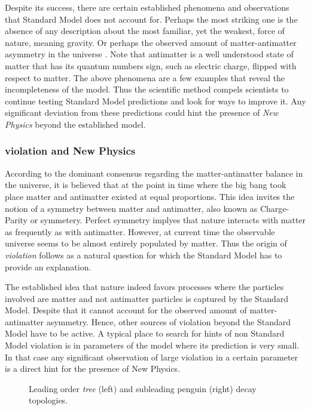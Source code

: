 Despite its success, there are certain established phenomena and observations that Standard
Model does not account for. Perhaps the most striking one is the absence of any description
about the most familiar, yet the weakest, force of nature, meaning gravity. Or perhaps the
observed amount of matter-antimatter asymmetry in the universe \cite{more-cpv-huet,more-cpv-gavela_I,more-cpv-gavela_II}.
Note that antimatter is a well understood state of matter that has its quantum numbers sign,
such as electric charge, flipped with respect to matter. The above phenomena are a few
examples that reveal the incompleteness of the model. Thus the scientific method compels
scientists to continue testing Standard Model predictions and look for ways to improve it.
Any significant deviation from these predictions could hint the presence of {\it New Physics}
beyond the established model.

\subsubsection{\CP violation and New Physics}
According to the dominant consensus regarding the matter-antimatter balance in the
universe, it is believed that at the point in time where the big bang took place
matter and antimatter existed at equal proportions. This idea invites the notion of a symmetry between matter and
antimatter, also known as Charge-Parity or \CP symmetery. Perfect \CP symmetry
implyes that nature interacts with matter as frequently as with antimatter.
However, at current time the observable universe seems to be almost entirely
populated by matter. Thus the origin of {\it \CP  violation} follows
as a natural question for which the Standard Model has to provide an explanation.

The established idea that nature indeed favors processes where the particles involved
are matter and not antimatter particles is captured by the Standard Model.
Despite that it cannot account for the observed amount of matter-antimatter asymmetry.
Hence, other sources of \CP violation beyond the Standard Model have to be active.
A typical place to search for hints of non Standard Model \CP violation is in parameters
of the model where its prediction is very small. In that case any significant observation
of large \CP violation in a certain parameter is a direct hint for the presence of New Physics.


\begin{figure}[t]
  \begin{subfigure}{0.5\textwidth}
    \raggedright
    {\scalebox{1}{\sffamily }}
    \caption{}
    \label{app_jpsiphi_tree}
  \end{subfigure}%
  \hfill
  \begin{subfigure}{0.5\textwidth}
    \raggedleft
    {\scalebox{1}{\sffamily }}
    \caption{}
    \label{app_jpsiphi_peng}
  \end{subfigure}
    \caption{Leading order {\it tree} (left) and subleading penguin (right) \BsJpsiPhi decay topologies.}
  \label{app_jpsiphi_tree_peng}
\end{figure}


